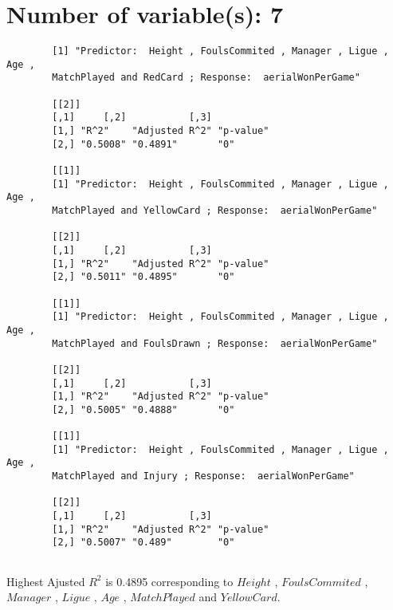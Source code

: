\documentclass[12pt]{article}
\begin{document}
	\section{Number of variable(s): 7}
	\begin{verbatim}
		[1] "Predictor:  Height , FoulsCommited , Manager , Ligue , Age , 
		MatchPlayed and RedCard ; Response:  aerialWonPerGame"
		
		[[2]]
		[,1]     [,2]           [,3]     
		[1,] "R^2"    "Adjusted R^2" "p-value"
		[2,] "0.5008" "0.4891"       "0"      
		
		[[1]]
		[1] "Predictor:  Height , FoulsCommited , Manager , Ligue , Age , 
		MatchPlayed and YellowCard ; Response:  aerialWonPerGame"
		
		[[2]]
		[,1]     [,2]           [,3]     
		[1,] "R^2"    "Adjusted R^2" "p-value"
		[2,] "0.5011" "0.4895"       "0"      
		
		[[1]]
		[1] "Predictor:  Height , FoulsCommited , Manager , Ligue , Age , 
		MatchPlayed and FoulsDrawn ; Response:  aerialWonPerGame"
		
		[[2]]
		[,1]     [,2]           [,3]     
		[1,] "R^2"    "Adjusted R^2" "p-value"
		[2,] "0.5005" "0.4888"       "0"      
		
		[[1]]
		[1] "Predictor:  Height , FoulsCommited , Manager , Ligue , Age , 
		MatchPlayed and Injury ; Response:  aerialWonPerGame"
		
		[[2]]
		[,1]     [,2]           [,3]     
		[1,] "R^2"    "Adjusted R^2" "p-value"
		[2,] "0.5007" "0.489"        "0"      
		
	\end{verbatim}
		Highest Ajusted $ R^2 $ is 0.4895 corresponding to $Height$ , $FoulsCommited$ , $Manager$ , $Ligue$ , $Age$ , 
		$ MatchPlayed $ and $ YellowCard $.
	
\end{document}
